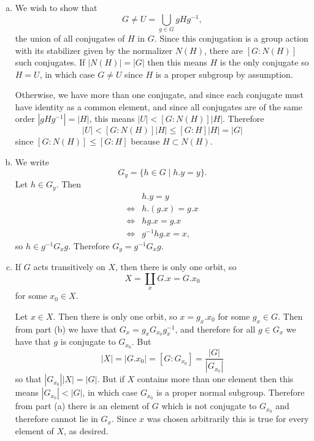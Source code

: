 \documentclass{article}
\begin{document}
\begin{Answer}
  \begin{enumerate}[(a)]
    \item{
      We wish to show that
      $$
      G \neq U = \bigcup_{g \in G} g H g^{-1},
      $$
      the union of all conjugates of $H$ in $G$. Since this conjugation is
      a group action with its stabilizer given by the normalizer
      $N(H)$, there are $[G : N(H)]$ such conjugates. If $|N(H)| = |G|$
      then this means $H$ is the only conjugate so $H = U$, in which
      case $G \neq U$ since $H$ is a proper subgroup by assumption.

      Otherwise, we have more than one conjugate, and since each
      conjugate must have identity as a common element, and since all
      conjugates are of the same order $|g H g^{-1}| = |H|$, this means
      $|U| < [G : N(H)]|H|$. Therefore
      $$
      |U| < [G : N(H)]|H| \leq [G : H] |H| = |G|
      $$
      since $[G : N(H)] \leq [G : H]$ because $H \subset N(H)$.
    }
    \item{
      We write
      $$
      G_y = \{ h \in G \mid h . y = y \}.
      $$
      Let $h \in G_y$. Then
      \begin{align*}
           & h . y = y \\
      \iff & h . (g . x) = g . x \\
      \iff & h g . x = g . x \\
      \iff & g^{-1} h g . x = x,
      \end{align*}
      so $h \in g^{-1} G_x g$. Therefore $G_y = g^{-1} G_x g$.
    }
    \item{
      If $G$ acts transitively on $X$, then there is only one orbit,
      so
      $$
      X = \coprod_x G . x = G . x_0
      $$
      for some $x_0 \in X$.

      Let $x \in X$. Then there is only one orbit, so
      $x = g_x . x_0$ for some $g_x \in G$. Then from part (b) we have
      that $G_x = g_x G_{x_0} g_x^{-1}$, and therefore for all $g \in
      G_x$ we have that $g$ is conjugate to $G_{x_0}$. But
      $$
      |X| = |G . x_0| = [G : G_{x_0}] = \frac{|G|}{|G_{x_0}|}
      $$
      so that $|G_{x_0}| |X| = |G|$. But if $X$ contains more than one
      element then this means $|G_{x_0}| < |G|$, in which case
      $G_{x_0}$ is a proper normal subgroup. Therefore from part (a)
      there is an element of $G$ which is not conjugate to $G_{x_0}$
      and therefore cannot lie in $G_x$. Since $x$ was chosen
      arbitrarily this is true for every element of $X$, as desired.
    }
  \end{enumerate}
\end{Answer}
\end{document}
